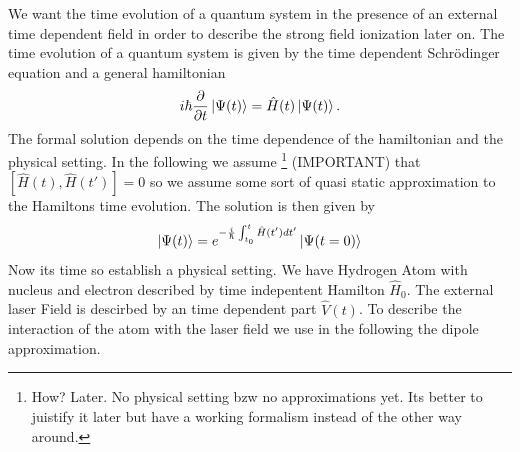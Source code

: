 We want the time evolution of a quantum system in the presence of an external time dependent field in order to describe the strong field ionization later on.
The time evolution of a quantum system is given by the time dependent Schrödinger equation and a general hamiltonian
\begin{equation}
    i \hbar \frac{\partial}{\partial t} \ket{\Psi(t)} = \hat{H}(t) \ket{\Psi(t)}.
\end{equation}
The formal solution depends on the time dependence of the hamiltonian and the physical setting. 
In the following we assume \footnote{How? Later. No physical setting bzw no approximations yet. 
Its better to juistify it later but have a working formalism instead of the other way around.} (IMPORTANT) that $[\hat{H}(t), \hat{H}(t')] = 0$ so we assume some sort of quasi static approximation to the Hamiltons time evolution. 
The solution is then given by 
\begin{equation}
    \ket{\Psi(t)} = e^{-\frac{i}{\hbar} \int_{t_0}^{t} \hat{H}(t') dt'} \ket{\Psi(t=0)}
\end{equation}
Now its time so establish a physical setting. We have Hydrogen Atom with nucleus and electron described by time indepentent Hamilton $\hat{H}_0$. 
The external laser Field is descirbed by an time dependent part $\hat{V}(t)$. To describe the interaction of the atom with the laser field we use in the following the dipole approximation.


